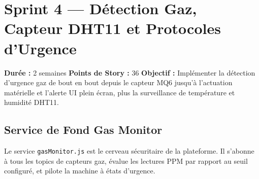 \chapter{Sprint 4 --- Détection Gaz, Capteur DHT11 et Protocoles d'Urgence}

\begin{tcolorbox}[sprintbox,title={Sprint 4 --- Systèmes de Sécurité}]
\textbf{Durée :} 2 semaines \quad
\textbf{Points de Story :} 36 \quad
\textbf{Objectif :} Implémenter la détection d'urgence gaz de bout en bout depuis le
capteur MQ6 jusqu'à l'actuation matérielle et l'alerte UI plein écran, plus la
surveillance de température et humidité DHT11.
\end{tcolorbox}

\section{Service de Fond Gas Monitor}

Le service \texttt{gasMonitor.js} est le cerveau sécuritaire de la plateforme. Il
s'abonne à tous les topics de capteurs gaz, évalue les lectures PPM par rapport au seuil
configuré, et pilote la machine à états d'urgence.

